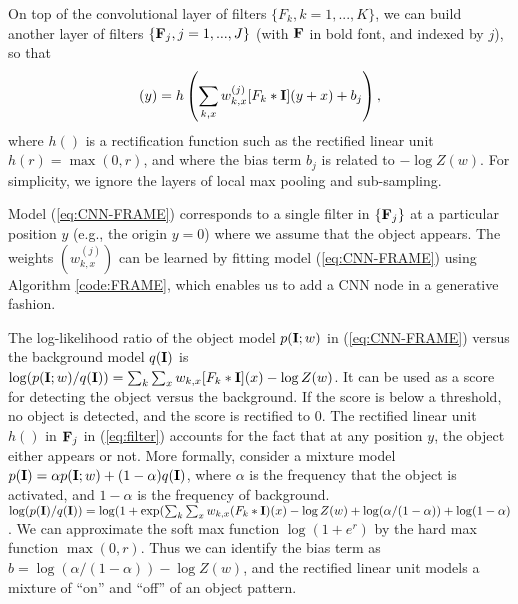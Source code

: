 \documentclass[letterpaper]{article}
\def\I{{\bf I}}
\def\F{{\bf F}}
\begin{document}
On top of the convolutional layer of filters $\{F_k, k = 1, ..., K\}$, we can build another layer of filters $\{\F_j, j = 1, ..., J\}$ (with $\F$ in bold font, and indexed by $j$), so that 
\begin{eqnarray}[\F_j*\I](y) = h\left( \sum_{k,  x} w^{(j)}_{k,   x}  [F_{k} * \I](y+x) +b_j\right),
\label{eq:filter}
\end{eqnarray}
where $h()$ is a rectification function such as the rectified linear unit $h(r) = \max(0, r)$, and where the bias term $b_j$ is related  to $-\log Z(w)$. For simplicity, we ignore the layers of local max pooling and sub-sampling.  

Model (\ref{eq:CNN-FRAME}) corresponds to a single filter in $\{\F_j\}$ at a particular position $y$ (e.g.,  the origin $y = 0$) where we assume that the object appears. The weights $(w^{(j)}_{k, x})$ can be learned by fitting model (\ref{eq:CNN-FRAME}) using Algorithm \ref{code:FRAME}, which enables us to add a CNN node in a generative fashion. 

The log-likelihood ratio of the object model $p(\I; w)$ in (\ref{eq:CNN-FRAME}) versus the  background model $q(\I)$ is $\log (p(\I; w)/q(\I))= \sum_{k} \sum_{x} w_{k, x} [F_k*\I](x) - \log Z(w)$. It  can be used as a score for detecting the object versus the background. If the score is below a threshold, no object is detected, and the score is rectified to 0.  The rectified linear unit $h()$ in $\F_j$ in (\ref{eq:filter}) accounts for the fact that at any position $y$, the object either appears or not. More formally, consider a mixture model $p(\I) = \alpha p(\I; w) + (1-\alpha) q(\I)$,  where $\alpha$ is the frequency that the object is activated, and $1-\alpha$ is the frequency of background. $\log (p(\I)/q(\I)) = \log (1+ \exp (\sum_{k} \sum_{x} w_{k, x} (F_k*\I)(x) - \log Z(w) + \log (\alpha/(1-\alpha)) + \log(1-\alpha)$. We can approximate the soft max function $\log (1+e^r)$ by the hard max function $\max(0, r)$. Thus we can identify the bias term as $b = \log(\alpha/(1-\alpha)) - \log Z(w)$, and the rectified linear unit models a mixture of ``on'' and ``off'' of an object pattern. 
\end{document}
